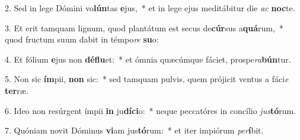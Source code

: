 2. Sed in lege Dómini vo\textbf{lún}tas \textbf{e}jus,~*  et in lege ejus meditábitur die \textit{ac} \textbf{noc}te.\

3. Et erit tamquam lignum, quod plantátum est secus de\textbf{cúr}sus a\textbf{quá}rum,~*  quod fructum suum dabit in témpo\textit{re} \textbf{su}o:\

4. Et fólium \textbf{e}jus non \textbf{dé}\textbf{flu}et:~*  et ómnia quæcúmque fáciet, prospe\textit{ra}\textbf{bún}tur.\

5. Non sic \textbf{ím}pii, \textbf{non} sic:~*  sed tamquam pulvis, quem prójicit ventus a fáci\textit{e} \textbf{ter}ræ.\

6. Ideo non resúrgent ímpii \textbf{in} ju\textbf{dí}\textbf{ci}o:~*  neque peccatóres in concílio \textit{jus}\textbf{tó}rum.\

7. Quóniam novit Dóminus \textbf{vi}am jus\textbf{tó}rum:~*  et iter impiórum \textit{per}\textbf{í}bit.\


